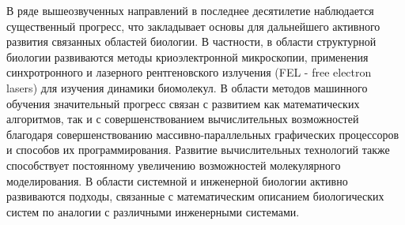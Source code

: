 В ряде вышеозвученных направлений в последнее десятилетие наблюдается существенный прогресс, что закладывает основы для дальнейшего активного развития связанных областей биологии. В частности, в области структурной биологии развиваются методы криоэлектронной микроскопии, применения синхротронного и лазерного рентгеновского излучения (FEL - free electron lasers) для изучения динамики биомолекул. В области методов машинного обучения значительный прогресс связан с развитием как математических алгоритмов, так и с совершенствованием вычислительных возможностей благодаря совершенствованию массивно-параллельных графических процессоров и способов их программирования. Развитие вычислительных технологий также способствует постоянному увеличению возможностей молекулярного моделирования. В области системной и инженерной биологии активно развиваются подходы, связанные с математическим описанием биологических систем по аналогии с различными инженерными системами. 

%

